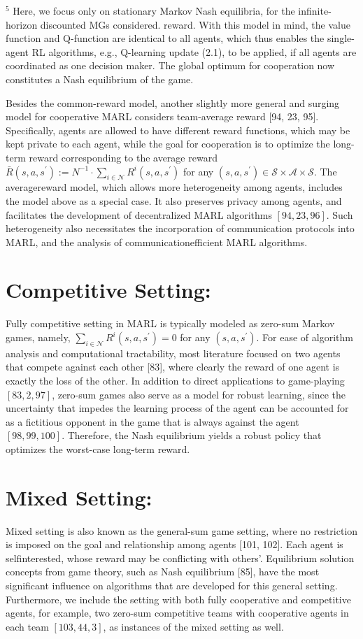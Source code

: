 \documentclass[10pt]{article}
\begin{document}
${ }^{5}$ Here, we focus only on stationary Markov Nash equilibria, for the infinite-horizon discounted MGs considered. reward. With this model in mind, the value function and Q-function are identical to all agents, which thus enables the single-agent RL algorithms, e.g., Q-learning update (2.1), to be applied, if all agents are coordinated as one decision maker. The global optimum for cooperation now constitutes a Nash equilibrium of the game.

Besides the common-reward model, another slightly more general and surging model for cooperative MARL considers team-average reward [94, 23, 95]. Specifically, agents are allowed to have different reward functions, which may be kept private to each agent, while the goal for cooperation is to optimize the long-term reward corresponding to the average reward $\bar{R}\left(s, a, s^{\prime}\right):=N^{-1} \cdot \sum_{i \in \mathcal{N}} R^{i}\left(s, a, s^{\prime}\right)$ for any $\left(s, a, s^{\prime}\right) \in \mathcal{S} \times \mathcal{A} \times \mathcal{S}$. The averagereward model, which allows more heterogeneity among agents, includes the model above as a special case. It also preserves privacy among agents, and facilitates the development of decentralized MARL algorithms $[94,23,96]$. Such heterogeneity also necessitates the incorporation of communication protocols into MARL, and the analysis of communicationefficient MARL algorithms.

\section{Competitive Setting:}
Fully competitive setting in MARL is typically modeled as zero-sum Markov games, namely, $\sum_{i \in \mathcal{N}} R^{i}\left(s, a, s^{\prime}\right)=0$ for any $\left(s, a, s^{\prime}\right)$. For ease of algorithm analysis and computational tractability, most literature focused on two agents that compete against each other [83], where clearly the reward of one agent is exactly the loss of the other. In addition to direct applications to game-playing $[83,2,97]$, zero-sum games also serve as a model for robust learning, since the uncertainty that impedes the learning process of the agent can be accounted for as a fictitious opponent in the game that is always against the agent $[98,99,100]$. Therefore, the Nash equilibrium yields a robust policy that optimizes the worst-case long-term reward.

\section{Mixed Setting:}
Mixed setting is also known as the general-sum game setting, where no restriction is imposed on the goal and relationship among agents [101, 102]. Each agent is selfinterested, whose reward may be conflicting with others'. Equilibrium solution concepts from game theory, such as Nash equilibrium [85], have the most significant influence on algorithms that are developed for this general setting. Furthermore, we include the setting with both fully cooperative and competitive agents, for example, two zero-sum competitive teams with cooperative agents in each team $[103,44,3]$, as instances of the mixed setting as well.
\end{document}
